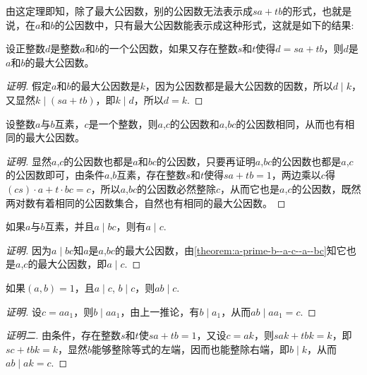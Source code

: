 由这定理即知，除了最大公因数，别的公因数无法表示成$sa+tb$的形式，也就是说，在$a$和$b$的公因数中，只有最大公因数能表示成这种形式，这就是如下的结果:
\begin{theorem}
  设正整数$d$是整数$a$和$b$的一个公因数，如果又存在整数$s$和$t$使得$d=sa+tb$，则$d$是$a$和$b$的最大公因数。
\end{theorem}

\begin{proof}[证明]
  假定$a$和$b$的最大公因数是$k$，因为公因数都是最大公因数的因数，所以$d \mid k$，又显然$k \mid (sa+tb)$，即$k \mid d$，所以$d=k$.
\end{proof}

\begin{theorem}
  \label{theorem:a-prime-b--a-c--a--bc}
  设整数$a$与$b$互素，$c$是一个整数，则$a$,$c$的公因数和$a$,$bc$的公因数相同，从而也有相同的最大公因数。
\end{theorem}

\begin{proof}[证明]
  显然$a$,$c$的公因数也都是$a$和$bc$的公因数，只要再证明$a$,$bc$的公因数也都是$a$,$c$的公因数即可，由条件$a$,$b$互素，存在整数$s$和$t$使得$sa+tb=1$，两边乘以$c$得$(cs)\cdot a+t\cdot bc=c$，所以$a$,$bc$的公因数必然整除$c$，从而它也是$a$,$c$的公因数，既然两对数有着相同的公因数集合，自然也有相同的最大公因数。
\end{proof}

\begin{inference}
  \label{inference:a-prime-b-and-a-mid-bc-so-a-mid-c}
  如果$a$与$b$互素，并且$a \mid bc$，则有$a \mid c$.
\end{inference}

\begin{proof}[证明]
  因为$a \mid bc$知$a$是$a$,$bc$的最大公因数，由\autoref{theorem:a-prime-b--a-c--a--bc}知它也是$a$,$c$的最大公因数，即$a \mid c$.
\end{proof}

\begin{inference}
  如果$(a,b)=1$，且$a \mid c$, $b \mid c$，则$ab \mid c$.
\end{inference}

\begin{proof}[证明]
  设$c=aa_1$，则$b \mid aa_1$，由上一推论，有$b \mid a_1$，从而$ab \mid aa_1=c$.
\end{proof}

\begin{proof}[证明二]
  由条件，存在整数$s$和$t$使$sa+tb=1$，又设$c=ak$，则$sak+tbk=k$，即$sc+tbk=k$，显然$b$能够整除等式的左端，因而也能整除右端，即$b \mid k$，从而$ab \mid ak=c$.
\end{proof}

